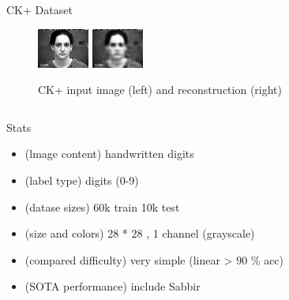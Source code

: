 \documentclass[final]{beamer}
\newlength{\onecolwid}
\newlength{\threecolwid}
\begin{document}
\begin{frame}[t]
\begin{columns}[t]
\begin{column}{\threecolwid}
\begin{columns}[t, totalwidth=\threecolwid]
\begin{column}{\onecolwid}
\begin{block}{CK+ Dataset}
\begin{figure}
\includegraphics[width=0.5\linewidth]{graphics/face.png}	
\includegraphics[width=0.5\linewidth]{graphics/reconst.png}
\caption{CK+ input image (left) and reconstruction (right)}
\end{figure}
\end{block}
\end{column}
\end{columns}

\begin{columns}[t, totalwidth=\threecolwid] %


\begin{column}{\onecolwid} %
\begin{block}{Stats}
\begin{itemize}
\item (lmage content) handwritten digits 
\item (label type) digits (0-9)
\item (datase sizes) 60k train 10k test
\item (size and colors) 28 * 28 , 1 channel (grayscale)
\item (compared difficulty) very simple (linear > 90 \% acc)
\item (SOTA performance) include Sabbir


\end{itemize}
\end{block}
\end{column}
\end{columns}
\end{column}
\end{columns}
\end{frame}
\end{document}
